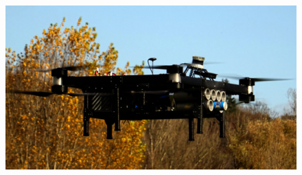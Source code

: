 \documentclass[aspectratio=169,9pt]{beamer}
\begin{document}
\begin{frame}
\begin{columns}[c]
    \vspace{-1em}

    \begin{figure}
      \centering
      \includegraphics[width=1.0\textwidth]{./fig/uavs/dofec_real.jpg}
    \end{figure}

  \end{columns}

\end{frame}








\end{document}
